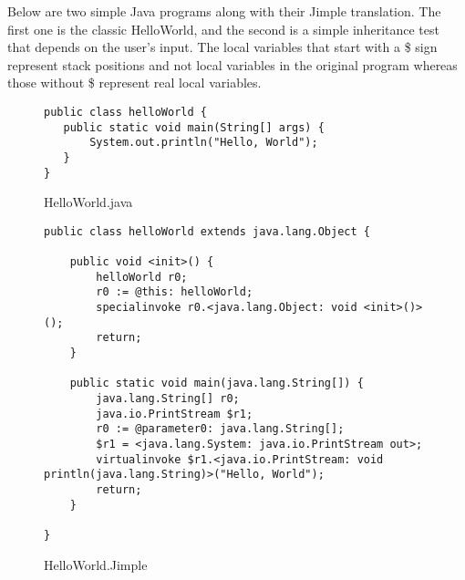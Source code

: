 \documentclass{dithesis}
\begin{document}


        Below are two simple Java programs along with their Jimple translation. The first one is the classic HelloWorld, and the second is a simple inheritance test that depends on the user's input.
       	The local variables that start with a \$ sign represent stack positions and not local variables in the original program whereas those without \$ represent real local variables.
            \begin{figure}[H]
\begin{lstlisting}
public class helloWorld {
   public static void main(String[] args) {
       System.out.println("Hello, World");
   }
}
\end{lstlisting}
            \caption{HelloWorld.java}
            \end{figure}
            \begin{figure}[H]
\begin{lstlisting}
public class helloWorld extends java.lang.Object {

    public void <init>() {
        helloWorld r0;
        r0 := @this: helloWorld;
        specialinvoke r0.<java.lang.Object: void <init>()>();
        return;
    }

    public static void main(java.lang.String[]) {
        java.lang.String[] r0;
        java.io.PrintStream $r1;
        r0 := @parameter0: java.lang.String[];
        $r1 = <java.lang.System: java.io.PrintStream out>;
        virtualinvoke $r1.<java.io.PrintStream: void println(java.lang.String)>("Hello, World");
        return;
    }

}
\end{lstlisting}
            \caption{HelloWorld.Jimple}
            \end{figure}
\end{document}
